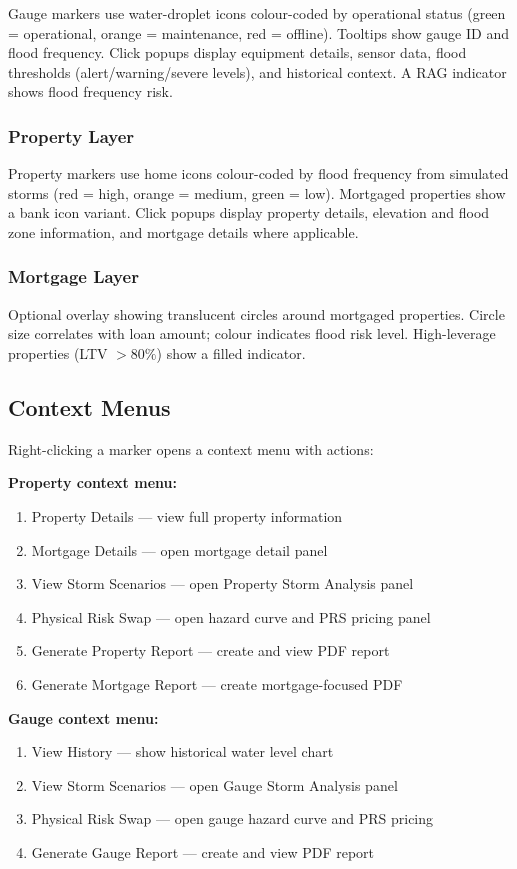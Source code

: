 \documentclass[11pt,a4paper]{article}
\begin{document}
Gauge markers use water-droplet icons colour-coded by operational status
(green = operational, orange = maintenance, red = offline). Tooltips show
gauge ID and flood frequency. Click popups display equipment details, sensor
data, flood thresholds (alert/warning/severe levels), and historical context.
A RAG indicator shows flood frequency risk.

\subsubsection{Property Layer}

Property markers use home icons colour-coded by flood frequency from simulated
storms (red = high, orange = medium, green = low). Mortgaged properties show
a bank icon variant. Click popups display property details, elevation and flood
zone information, and mortgage details where applicable.

\subsubsection{Mortgage Layer}

Optional overlay showing translucent circles around mortgaged properties.
Circle size correlates with loan amount; colour indicates flood risk level.
High-leverage properties (LTV $> 80\%$) show a filled indicator.

\subsection{Context Menus}

Right-clicking a marker opens a context menu with actions:

\textbf{Property context menu:}
\begin{enumerate}[nosep]
    \item Property Details --- view full property information
    \item Mortgage Details --- open mortgage detail panel
    \item View Storm Scenarios --- open Property Storm Analysis panel
    \item Physical Risk Swap --- open hazard curve and PRS pricing panel
    \item Generate Property Report --- create and view PDF report
    \item Generate Mortgage Report --- create mortgage-focused PDF
\end{enumerate}

\textbf{Gauge context menu:}
\begin{enumerate}[nosep]
    \item View History --- show historical water level chart
    \item View Storm Scenarios --- open Gauge Storm Analysis panel
    \item Physical Risk Swap --- open gauge hazard curve and PRS pricing
    \item Generate Gauge Report --- create and view PDF report
\end{enumerate}
\end{document}
